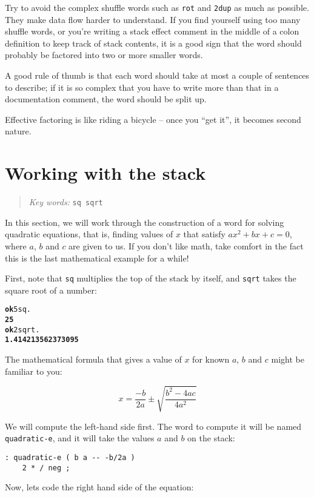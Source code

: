 \documentclass[english]{book}
\newcommand{\chapkeywords}[1]{%
\begin{quote}
\emph{Key words:} \texttt{#1}
\end{quote}
}
\begin{document}
Try to avoid the complex shuffle words such as \texttt{rot} and \texttt{2dup} as much as possible. They make data flow harder to understand. If you find yourself using too many shuffle words, or you're writing
a stack effect comment in the middle of a colon definition to keep track of stack contents, it is
a good sign that the word should probably be factored into two or
more smaller words.

A good rule of thumb is that each word should take at most a couple of sentences to describe; if it is so complex that you have to write more than that in a documentation comment, the word should be split up.

Effective factoring is like riding a bicycle -- once you ``get it'', it becomes second nature.

\section{Working with the stack}

\chapkeywords{sq sqrt}

In this section, we will work through the construction of a word for solving quadratic equations, that is, finding values of $x$ that satisfy $ax^2+bx+c=0$, where $a$, $b$ and $c$ are given to us. If you don't like math, take comfort in the fact this is the last mathematical example for a while!

First, note that \texttt{sq} multiplies the top of the stack by itself, and \texttt{sqrt} takes the square root of a number:

\begin{alltt}
\textbf{ok} 5 sq .
\textbf{25}
\textbf{ok} 2 sqrt .
\textbf{1.414213562373095}
\end{alltt}

The mathematical formula that gives a value of $x$ for known $a$, $b$ and $c$ might be familiar to you:

$$x=\frac{-b}{2a}\pm\sqrt{\frac{b^2-4ac}{4a^2}}$$

We will compute the left-hand side first. The word to compute it will be named \texttt{quadratic-e}, and it will take the values $a$ and $b$ on the stack:

\begin{verbatim}
: quadratic-e ( b a -- -b/2a )
    2 * / neg ;
\end{verbatim}

Now, lets code the right hand side of the equation:
\end{document}

